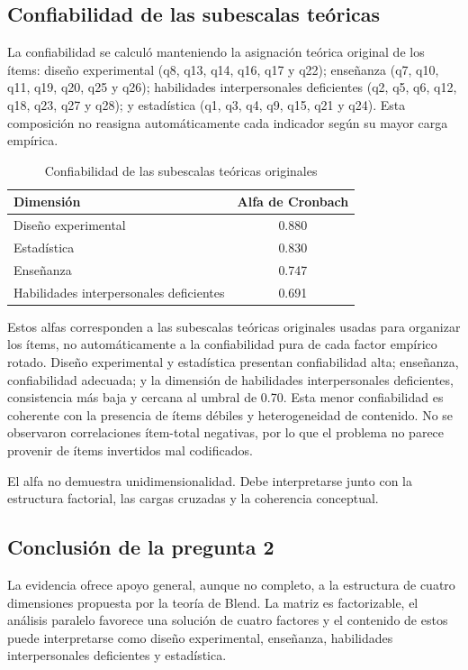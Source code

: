 \documentclass[12pt,letterpaper]{article}
\begin{document}
\subsection{Confiabilidad de las subescalas teóricas}

La confiabilidad se calculó manteniendo la asignación teórica original de los ítems: diseño experimental (q8, q13, q14, q16, q17 y q22); enseñanza (q7, q10, q11, q19, q20, q25 y q26); habilidades interpersonales deficientes (q2, q5, q6, q12, q18, q23, q27 y q28); y estadística (q1, q3, q4, q9, q15, q21 y q24). Esta composición no reasigna automáticamente cada indicador según su mayor carga empírica.

\begin{table}[H]
\centering
\caption{Confiabilidad de las subescalas teóricas originales}
\begin{tabular}{lc}
\toprule
Dimensión & Alfa de Cronbach \\
\midrule
Diseño experimental & 0.880 \\
Estadística & 0.830 \\
Enseñanza & 0.747 \\
Habilidades interpersonales deficientes & 0.691 \\
\bottomrule
\end{tabular}
\end{table}

Estos alfas corresponden a las subescalas teóricas originales usadas para organizar los ítems, no automáticamente a la confiabilidad pura de cada factor empírico rotado. Diseño experimental y estadística presentan confiabilidad alta; enseñanza, confiabilidad adecuada; y la dimensión de habilidades interpersonales deficientes, consistencia más baja y cercana al umbral de 0.70. Esta menor confiabilidad es coherente con la presencia de ítems débiles y heterogeneidad de contenido. No se observaron correlaciones ítem-total negativas, por lo que el problema no parece provenir de ítems invertidos mal codificados.

El alfa no demuestra unidimensionalidad. Debe interpretarse junto con la estructura factorial, las cargas cruzadas y la coherencia conceptual.

\subsection{Conclusión de la pregunta 2}

La evidencia ofrece apoyo general, aunque no completo, a la estructura de cuatro dimensiones propuesta por la teoría de Blend. La matriz es factorizable, el análisis paralelo favorece una solución de cuatro factores y el contenido de estos puede interpretarse como diseño experimental, enseñanza, habilidades interpersonales deficientes y estadística.
\end{document}
